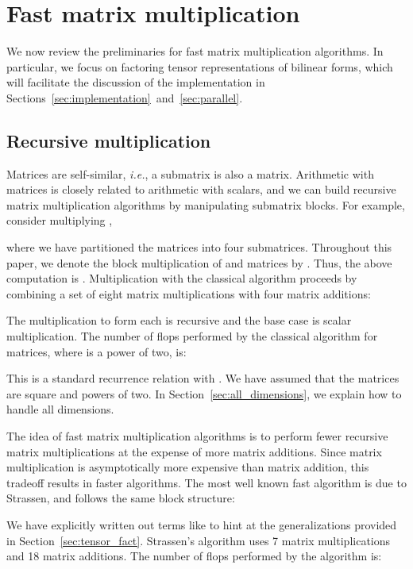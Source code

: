 \documentclass[preprint]{sigplanconf}
\begin{document}
\section{Fast matrix multiplication}
\label{sec:fast}

We now review the preliminaries for fast matrix multiplication algorithms.
In particular, we focus on factoring tensor representations of bilinear forms,
which will facilitate the discussion of the implementation in Sections~\ref{sec:implementation}~and~\ref{sec:parallel}.

\subsection{Recursive multiplication}
\label{sec:recursive}

Matrices are self-similar, \emph{i.e.}, a submatrix is also a matrix.
Arithmetic with matrices is closely related to arithmetic with scalars, and
we can build recursive matrix multiplication algorithms by manipulating submatrix blocks.
For example, consider multiplying ,

where we have partitioned the matrices into four submatrices.
Throughout this paper, we denote the block multiplication of  and  matrices by .
Thus, the above computation is .
Multiplication with the classical algorithm proceeds by combining a set of eight matrix multiplications with four matrix additions:

\vspace{-0.7cm} 
The multiplication to form each  is recursive and the base case is scalar multiplication.
The number of flops performed by the classical algorithm for  matrices, where  is a power of two, is:

This is a standard recurrence relation with .
We have assumed that the matrices are square and powers of two.
In Section~\ref{sec:all_dimensions}, we explain how to handle all dimensions.

The idea of fast matrix multiplication algorithms is to perform fewer recursive matrix multiplications at the expense of more matrix additions.
Since matrix multiplication is asymptotically more expensive than matrix addition, this tradeoff results in faster algorithms.
The most well known fast algorithm is due to Strassen, and follows the same block structure:



We have explicitly written out terms like  to hint at the generalizations provided in Section~\ref{sec:tensor_fact}.
Strassen's algorithm uses 7 matrix multiplications and 18 matrix additions.
The number of flops performed by the algorithm is:
\end{document}
